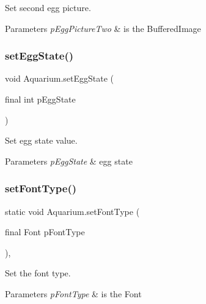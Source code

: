Set second egg picture.


\begin{DoxyParams}{Parameters}
{\em p\+Egg\+Picture\+Two} & is the Buffered\+Image \\
\hline
\end{DoxyParams}
\mbox{\label{class_aquarium_a2f943847eaa591471bd6d50dd17989f5}} 
\subsubsection{\texorpdfstring{set\+Egg\+State()}{setEggState()}}
{\footnotesize\ttfamily void Aquarium.\+set\+Egg\+State (\begin{DoxyParamCaption}\item[{final int}]{p\+Egg\+State }\end{DoxyParamCaption})\hspace{0.3cm}{\ttfamily [inline]}}

Set egg state value.


\begin{DoxyParams}{Parameters}
{\em p\+Egg\+State} & egg state \\
\hline
\end{DoxyParams}
\mbox{\label{class_aquarium_a65f0247ca0458a289572ec8cd375e9f1}} 
\subsubsection{\texorpdfstring{set\+Font\+Type()}{setFontType()}}
{\footnotesize\ttfamily static void Aquarium.\+set\+Font\+Type (\begin{DoxyParamCaption}\item[{final Font}]{p\+Font\+Type }\end{DoxyParamCaption})\hspace{0.3cm}{\ttfamily [inline]}, {\ttfamily [static]}}

Set the font type.


\begin{DoxyParams}{Parameters}
{\em p\+Font\+Type} & is the Font \\
\hline
\end{DoxyParams}
\mbox{\label{class_aquarium_a339b7094b59172816c41e5284411893e}} 
